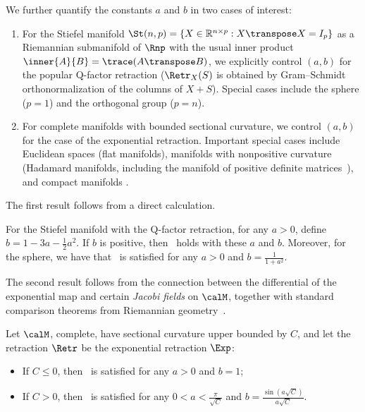 We further quantify the constants $a$ and $b$ in two cases of interest:
\begin{enumerate}
	\item For the Stiefel manifold $\St(n,p) = \{X \in \mathbb{R}^{n \times p} : X\transpose X = I_p\}$ as a Riemannian submanifold of $\Rnp$ with the usual inner product $\inner{A}{B} = \trace(A\transpose B)$, we explicitly control $(a, b)$ for the popular Q-factor retraction ($\Retr_X(S)$ is obtained by Gram--Schmidt orthonormalization of the columns of $X+S$). Special cases include the sphere ($p=1$) and the orthogonal group ($p = n$).
	\item For complete manifolds with bounded sectional curvature, we control $(a, b)$ for the case of the exponential retraction. Important special cases include Euclidean spaces (flat manifolds), manifolds with nonpositive curvature (Hadamard manifolds, including the manifold of positive definite matrices~\citep{moakher2006symmetric,Bhatia}), and compact manifolds \citep[\S9.3, p166]{bishop1964geometry}.
\end{enumerate}

The first result follows from a direct calculation. 
\begin{proposition} \label{prop:stiefelmastercorollary}
	For the Stiefel manifold with the Q-factor retraction,
	for any $a > 0$, define $b  = 1 - 3a - \frac{1}{2}a^2$. If $b$ is positive, then~ holds with these $a$ and $b$. Moreover, for the sphere, we have that~ is satisfied for any $a > 0$ and $b = \frac{1}{1 + a^2}$.
\end{proposition}

The second result follows from the connection between the differential of the exponential map and certain \emph{Jacobi fields} on $\calM$, together with standard comparison theorems from Riemannian geometry~\citep[Ch.~10, 11]{lee2018riemannian}.
\begin{proposition} \label{prop:mastercorollaryexponetial}
	Let $\calM$, complete,
	have sectional curvature upper bounded by $C$, and let the retraction $\Retr$ be the exponential retraction $\Exp$:
	\begin{itemize}
		\item[] If $C \leq 0$, then~ is satisfied for any $a > 0$ and $b = 1$;
		\item[] If $C > 0$, then~ is satisfied for any $0 < a < \frac{\pi}{\sqrt{C}}$ and $b = \frac{\sin(a\sqrt{C})}{a\sqrt{C}}$.
	\end{itemize}
\end{proposition}



